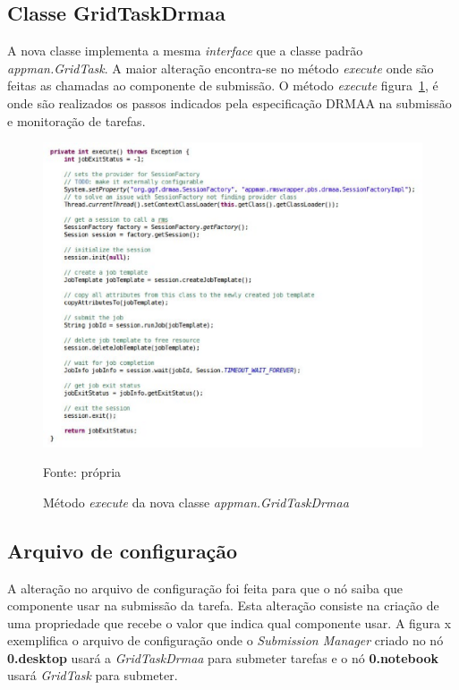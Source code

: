 \subsection{Classe GridTaskDrmaa}

A nova classe implementa a mesma \emph{interface} que a classe padrão \emph{appman.GridTask}. A maior alteração encontra-se no método \emph{execute} onde são feitas as chamadas ao componente de submissão. O método \emph{execute} figura~\ref{fig:execute}, é onde são realizados os passos indicados pela especificação DRMAA na submissão e monitoração de tarefas.

\begin{figure}[htb]
\begin{center}
\includegraphics[scale=0.65]{./img/execute.eps}
\caption{Método \emph{execute} da nova classe \emph{appman.GridTaskDrmaa}}
\label{fig:execute}
Fonte: própria
\end{center}
\end{figure}

\subsection{Arquivo de configuração}

A alteração no arquivo de configuração foi feita para que o nó saiba que componente usar na submissão da tarefa. Esta alteração consiste na criação de uma propriedade que recebe o valor que indica qual componente usar. A figura x exemplifica o arquivo de configuração onde o \emph{Submission Manager} criado no nó \textbf{0.desktop} usará a \emph{GridTaskDrmaa} para submeter tarefas e o nó \textbf{0.notebook} usará \emph{GridTask} para submeter.

